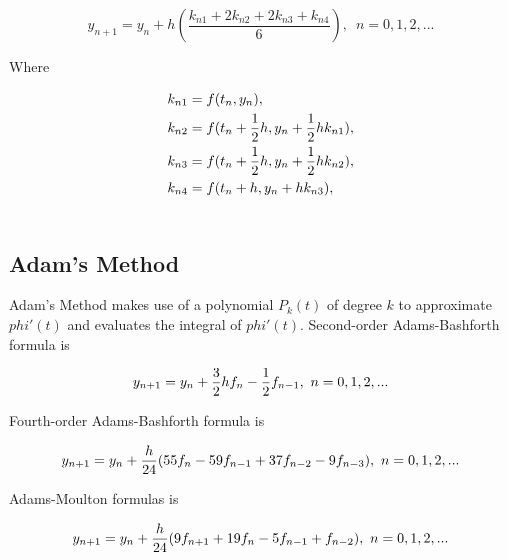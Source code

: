 \documentclass[a4paper]{article}
\begin{document}
	\begin{equation}\label{eq.4}
		y_{n+1} = y_n + h(\frac{k_{n1} + 2k_{n2} + 2k_{n3} + k_{n4} }{6}), \enspace n = 0, 1, 2,...
	\end{equation}
	
	Where
	
	\begin{align} \nonumber
		k_{n1} &= f(t_n, y_n), \\ \nonumber
		k_{n2} &= f(t_n + {1 \over 2}h, y_n + {1 \over 2}hk_{n1}), \\ \nonumber
		k_{n3} &= f(t_n + {1 \over 2}h, y_n + {1 \over 2}hk_{n2}), \\ \nonumber
		k_{n4} &= f(t_n + h, y_n + hk_{n3}), \\ \nonumber
	\end{align}
	
	
	\subsection{Adam’s Method}
	
	Adam’s Method makes use of a polynomial $P_k(t)$ of degree $k$ to approximate $phi'(t)$ and evaluates the integral of $phi'(t)$.
	Second-order Adams-Bashforth formula is
	
	\begin{equation}\label{eq.6}
		y_{n+1} = y_n + {3 \over 2}hf_n - {1 \over 2}f_{n-1}, \  n = 0,1,2,...
	\end{equation}
	
	Fourth-order Adams-Bashforth formula is
	
	\begin{equation}\label{eq.7}
		y_{n+1} = y_n + {h \over 24}(55f_n - 59f_{n-1} + 37f_{n-2} - 9f_{n-3}), \  n = 0,1,2,...
	\end{equation}
	
	Adams-Moulton formulas is
	
	\begin{equation}\label{eq.7}
		y_{n+1} = y_n + {h \over 24}(9f_{n+1} + 19f_{n} - 5f_{n-1} + f_{n-2}), \  n = 0,1,2,...
	\end{equation}
	
	
	
	
	
\end{document}
